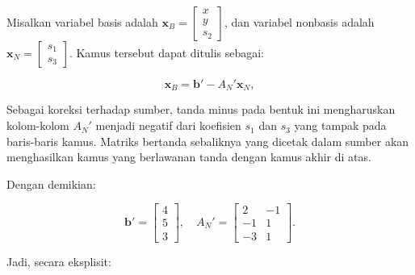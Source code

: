 \begin{tcolorbox}[colback=algopt!6, colframe=algopt, coltitle=white, fonttitle=\bfseries, sharp corners,
    title=\textbf{Kamus Akhir dalam Notasi Matriks}]
Misalkan variabel basis adalah $\mathbf{x}_B = \begin{bmatrix} x \\ y \\ s_2 \end{bmatrix}$,
dan variabel nonbasis adalah $\mathbf{x}_N = \begin{bmatrix} s_1 \\ s_3 \end{bmatrix}$.
Kamus tersebut dapat ditulis sebagai:

$$
\mathbf{x}_B = \mathbf{b}' - A_N' \mathbf{x}_N,
$$

Sebagai koreksi terhadap sumber, tanda minus pada bentuk ini mengharuskan
kolom-kolom \(A_N'\) menjadi negatif dari koefisien \(s_1\) dan \(s_3\)
yang tampak pada baris-baris kamus. Matriks bertanda sebaliknya yang dicetak
dalam sumber akan menghasilkan kamus yang berlawanan tanda dengan kamus akhir
di atas.

Dengan demikian:

$$
\mathbf{b}' =
\begin{bmatrix}
4 \\
5 \\
3
\end{bmatrix}, \quad
A_N' =
\begin{bmatrix}
2 & -1 \\
-1 & 1 \\
-3 & 1
\end{bmatrix}.
$$

Jadi, secara eksplisit:


\end{tcolorbox}
